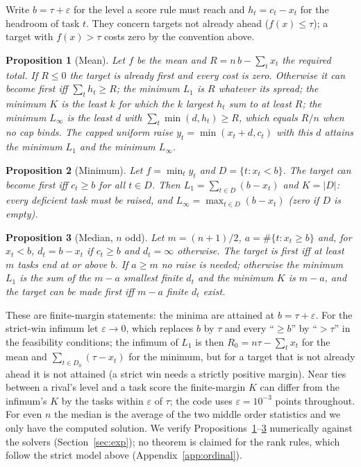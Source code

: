 \documentclass{article}
\newtheorem{proposition}{Proposition}
\begin{document}
Write $b=\tau+\varepsilon$ for the level a score rule must reach and $h_t=c_t-x_t$ for the headroom of task $t$. They concern targets not already ahead ($f(x)\le\tau$); a target with $f(x)>\tau$ costs zero by the convention above.
\begin{proposition}[Mean]\label{prop:mean}
Let $f$ be the mean and $R=n\,b-\sum_t x_t$ the required total. If $R\le0$ the target is already first and every cost is zero. Otherwise it can become first iff $\sum_t h_t\ge R$; the minimum $L_1$ is $R$ whatever its spread; the minimum $K$ is the least $k$ for which the $k$ largest $h_t$ sum to at least $R$; the minimum $L_\infty$ is the least $d$ with $\sum_t\min(d,h_t)\ge R$, which equals $R/n$ when no cap binds. The capped uniform raise $y_t=\min(x_t+d,c_t)$ with this $d$ attains the minimum $L_1$ and the minimum $L_\infty$.
\end{proposition}
\begin{proposition}[Minimum]\label{prop:min}
Let $f=\min_t y_t$ and $D=\{t:x_t<b\}$. The target can become first iff $c_t\ge b$ for all $t\in D$. Then $L_1=\sum_{t\in D}(b-x_t)$ and $K=|D|$: every deficient task must be raised, and $L_\infty=\max_{t\in D}(b-x_t)$ (zero if $D$ is empty).
\end{proposition}
\begin{proposition}[Median, $n$ odd]\label{prop:median}
Let $m=(n+1)/2$, $a=\#\{t:x_t\ge b\}$ and, for $x_t<b$, $d_t=b-x_t$ if $c_t\ge b$ and $d_t=\infty$ otherwise. The target is first iff at least $m$ tasks end at or above $b$. If $a\ge m$ no raise is needed; otherwise the minimum $L_1$ is the sum of the $m-a$ smallest finite $d_t$ and the minimum $K$ is $m-a$, and the target can be made first iff $m-a$ finite $d_t$ exist.
\end{proposition}
These are finite-margin statements: the minima are attained at $b=\tau+\varepsilon$. For the strict-win infimum let $\varepsilon\to0$, which replaces $b$ by $\tau$ and every ``$\ge b$'' by ``$>\tau$'' in the feasibility conditions; the infimum of $L_1$ is then $R_0=n\tau-\sum_tx_t$ for the mean and $\sum_{t\in D_0}(\tau-x_t)$ for the minimum, but for a target that is not already ahead it is not attained (a strict win needs a strictly positive margin). Near ties between a rival's level and a task score the finite-margin $K$ can differ from the infimum's $K$ by the tasks within $\varepsilon$ of $\tau$; the code uses $\varepsilon=10^{-3}$ points throughout. For even $n$ the median is the average of the two middle order statistics and we only have the computed solution. We verify Propositions~\ref{prop:mean}--\ref{prop:median} numerically against the solvers (Section~\ref{sec:exp}); no theorem is claimed for the rank rules, which follow the strict model above (Appendix~\ref{app:ordinal}).
\end{document}
